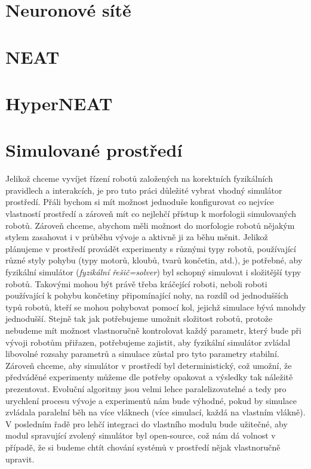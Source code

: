 \section{Neuronové sítě} \label{NN}
\section{NEAT} \label{NN - NEAT}
\section{HyperNEAT} \label{NN - HyperNEAT}

\section{Simulované prostředí} \label{Simulované prostředí}

Jelikož chceme vyvíjet řízení robotů založených na korektních fyzikálních
pravidlech a interakcích, je pro tuto práci důležité vybrat vhodný simulátor
prostředí. Přáli bychom si mít možnost jednoduše konfigurovat co nejvíce
vlastností prostředí a zároveň mít co nejlehčí přístup k morfologii
simulovaných robotů. Zároveň chceme, abychom měli možnost do morfologie robotů
nějakým stylem zasahovat i v průběhu vývoje a aktivně ji za běhu měnit. Jelikož
plánujeme v prostředí provádět experimenty s různými typy robotů, používající
různé styly pohybu (typy motorů, kloubů, tvarů končetin, atd.), je potřebné,
aby fyzikální simulátor (\emph{fyzikální řešič=solver}) byl schopný simulovat i
složitější typy robotů. Takovými mohou být právě třeba kráčející roboti, neboli
roboti používající k pohybu končetiny připomínající nohy, na rozdíl od
jednodušších typů robotů, kteří se mohou pohybovat pomocí kol, jejichž simulace
bývá mnohdy jednodušší. Stejně tak jak potřebujeme umožnit složitost robotů,
protože nebudeme mít možnost vlastnoručně kontrolovat každý parametr, který
bude při vývoji robotům přiřazen, potřebujeme zajistit, aby fyzikální simulátor
zvládal libovolné rozsahy parametrů a simulace zůstal pro tyto parametry
stabilní. Zároveň chceme, aby simulátor v prostředí byl
deterministický, což umožní, že předváděné experimenty můžeme dle potřeby
opakovat a výsledky tak náležitě prezentovat. Evoluční algoritmy jsou velmi
lehce paralelizovatelné a tedy pro urychlení procesu vývoje a experimentů nám
bude výhodné, pokud by simulace zvládala paralelní běh na více vláknech (více
simulací, každá na vlastním vlákně). V posledním řadě pro lehčí integraci do
vlastního modulu bude užitečné, aby modul spravující zvolený simulátor byl
open-source, což nám dá volnost v případě, že si budeme chtít chování systémů v
prostředí nějak vlastnoručně upravit.

